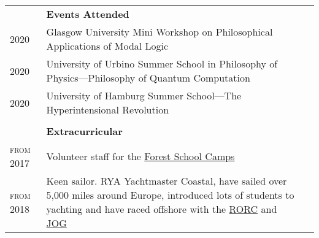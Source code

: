 \documentclass{article}
\renewcommand{\section}[1]{\\[-1.0ex]& \multicolumn{2}{l}{\bfseries{\Large{#1}}}\vspace{0.5ex}\\}
\newcommand{\entry}[3]{\scriptsize{\textsc{#1}} & #2 & #3 \\}
\begin{document}
\begin{tabularx}{\textwidth}{ p{6em} X p{6em} }
\section{Events Attended}
\entry{2020}{Glasgow University Mini Workshop on Philosophical Applications of Modal Logic}{}
\entry{2020}{University of Urbino Summer School in Philosophy of Physics---Philosophy of Quantum Computation}{}
\entry{2020}{University of Hamburg Summer School---The Hyperintensional Revolution}{}

\section{Extracurricular}
\entry{from 2017}{Volunteer staff for the \href{https://www.fsc.org.uk/}{Forest School Camps}}{}
\entry{from 2018}{Keen sailor. RYA Yachtmaster Coastal, have sailed over 5,000 miles around Europe, introduced lots of students to yachting and have raced offshore with the \href{https://www.rorc.org}{RORC} and \href{https://jog.org.uk}{JOG}}{}

\end{tabularx}
\end{document}
